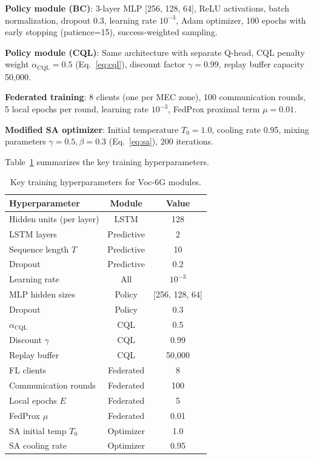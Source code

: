\documentclass[10pt,letterpaper]{article}
\providecommand{\VocSixG}{Voc-6G}
\begin{document}
\textbf{Policy module (BC)}: 3-layer MLP [256, 128, 64], ReLU activations, batch normalization, dropout 0.3, learning rate $10^{-3}$, Adam optimizer, 100 epochs with early stopping (patience=15), success-weighted sampling.

\textbf{Policy module (CQL)}: Same architecture with separate Q-head, CQL penalty weight $\alpha_{\text{CQL}}=0.5$ (Eq.~\ref{eq:cql}), discount factor $\gamma=0.99$, replay buffer capacity 50,000.

\textbf{Federated training}: 8 clients (one per MEC zone), 100 communication rounds, 5 local epochs per round, learning rate $10^{-3}$, FedProx proximal term $\mu=0.01$.

\textbf{Modified SA optimizer}: Initial temperature $T_0=1.0$, cooling rate 0.95, mixing parameters $\gamma=0.5, \beta=0.3$ (Eq.~\ref{eq:sa}), 200 iterations.

Table~\ref{tab:training_config} summarizes the key training hyperparameters.

\begin{table}[t]
\centering
\caption{Key training hyperparameters for \VocSixG{} modules.}
\label{tab:training_config}
\small
\begin{tabular}{lcc}
\toprule
\textbf{Hyperparameter} & \textbf{Module} & \textbf{Value} \\
\midrule
Hidden units (per layer) & LSTM & 128 \\
LSTM layers & Predictive & 2 \\
Sequence length $T$ & Predictive & 10 \\
Dropout & Predictive & 0.2 \\
Learning rate & All & $10^{-3}$ \\
MLP hidden sizes & Policy & [256, 128, 64] \\
Dropout & Policy & 0.3 \\
$\alpha_{\text{CQL}}$ & CQL & 0.5 \\
Discount $\gamma$ & CQL & 0.99 \\
Replay buffer & CQL & 50,000 \\
FL clients & Federated & 8 \\
Communication rounds & Federated & 100 \\
Local epochs $E$ & Federated & 5 \\
FedProx $\mu$ & Federated & 0.01 \\
SA initial temp $T_0$ & Optimizer & 1.0 \\
SA cooling rate & Optimizer & 0.95 \\
\bottomrule
\end{tabular}
\end{table}
\end{document}
